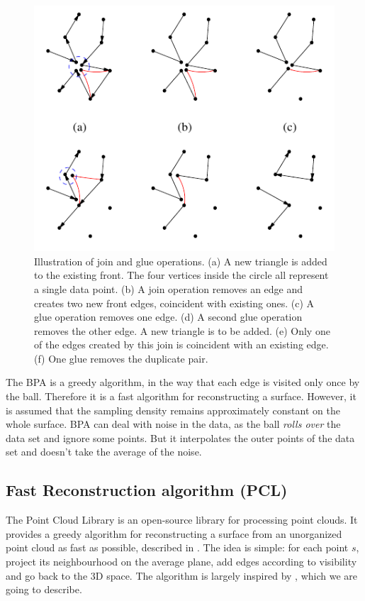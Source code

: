 \documentclass[12pt]{article}
\begin{document}
\begin{figure}[h]
  \centering
  \includegraphics[scale=0.5]{joinglue.png}
  \caption{\label{joinglue} Illustration of join and glue operations. (a) A new triangle is added to the existing front. The four vertices inside the circle all represent a single data point. (b) A join operation removes an edge and creates two new front edges, coincident with existing ones. (c) A glue operation removes one edge. (d) A second glue operation removes the other edge. A new triangle is to be added. (e) Only one of the edges created by this join is coincident with an existing edge. (f) One glue removes the duplicate pair.
}
\end{figure}

The BPA is a greedy algorithm, in the way that each edge is visited only once by the ball. Therefore it is a fast algorithm for reconstructing a surface. However, it is assumed that the sampling density remains approximately constant on the whole surface. BPA can deal with noise in the data, as the ball \emph{rolls over} the data set and ignore some points. But it interpolates the outer points of the data set and doesn't take the average of the noise.

\subsection{Fast Reconstruction algorithm (PCL)}
The Point Cloud Library is an open-source library for processing point clouds. It provides a greedy algorithm for reconstructing a surface from an unorganized point cloud as fast as possible, described in \cite{PCL1}. The idea is simple: for each point $s$, project its neighbourhood on the average plane, add edges according to visibility and go back to the 3D space. The algorithm is largely inspired by \cite{PCL2}, which we are going to describe.
\end{document}

